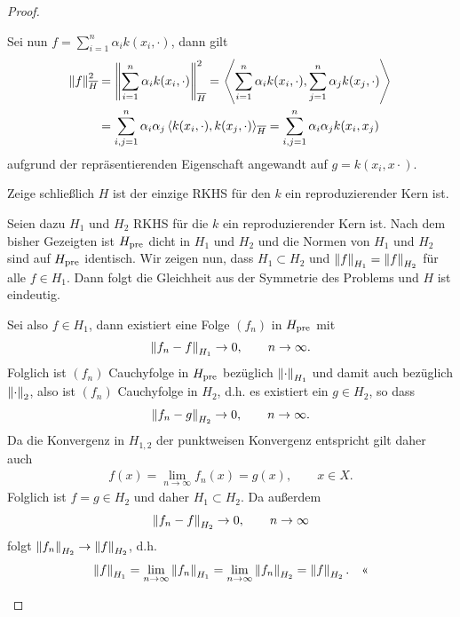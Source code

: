 \begin{proof}
\begin{proofenum}
\begin{proofenuma}
Sei nun $f=\sum_{i=1}^n \alpha_i k(x_i,\cdot)$, dann gilt
\begin{align*}
\left\|f\right\|_{{\overline{H}}}^2 &= \left\|\sum_{i=1}^n \alpha_i k(x_i,\cdot)\right\|_{{\overline{H}}}^2
= \left\langle\sum_{i=1}^n \alpha_i k(x_i,\cdot),\sum_{j=1}^n \alpha_j k(x_j,\cdot)\right\rangle\\
&= \sum_{i,j=1}^n \alpha_i\alpha_j \left\langle k(x_i,\cdot),k(x_j,\cdot)\right\rangle_{{\overline{H}}}
= \sum_{i,j=1}^n \alpha_i\alpha_j k(x_i,x_j)
\end{align*}
aufgrund der repräsentierenden Eigenschaft angewandt auf $g=k(x_i,x\cdot)$.
\end{proofenuma}
\item Zeige schließlich $H$ ist der einzige RKHS für den $k$ ein
reproduzierender Kern ist.

Seien dazu $H_1$ und $H_2$ RKHS für die $k$ ein reproduzierender Kern ist. Nach
dem bisher Gezeigten ist $H_{\mathrm{pre}}$ dicht in $H_1$ und $H_2$ und die Normen von
$H_1$ und $H_2$ sind auf $H_{\mathrm{pre}}$ identisch. Wir zeigen nun, dass $H_1\subset
H_2$ und $\left\|f\right\|_{H_1}= \left\|f\right\|_{H_2}$ für alle $f\in H_1$. Dann folgt die
Gleichheit aus der Symmetrie des Problems und $H$ ist eindeutig.

Sei also $f\in H_1$, dann existiert eine Folge $(f_n)$ in $H_{\mathrm{pre}}$ mit
\begin{align*}
\left\|f_n-f\right\|_{H_1}\to 0,\qquad n\to\infty.
\end{align*}
Folglich ist $(f_n)$ Cauchyfolge in $H_{\mathrm{pre}}$
bezüglich $\left\|\cdot\right\|_{H_1}$ und damit auch bezüglich $\left\|\cdot\right\|_2$, also
ist $(f_n)$ Cauchyfolge in $H_2$, d.h. es existiert ein $g\in H_2$, so dass
\begin{align*}
\left\|f_n-g\right\|_{H_2} \to 0,\qquad n\to\infty.
\end{align*}
Da die Konvergenz in $H_{1,2}$ der punktweisen Konvergenz entspricht gilt daher
auch
\begin{align*}
f(x) = \lim\limits_{n\to\infty} f_n(x) = g(x),\qquad x\in X.
\end{align*}
Folglich ist $f=g\in H_2$ und daher $H_1\subset H_2$. Da außerdem
\begin{align*}
\left\|f_n-f\right\|_{H_2} \to 0,\qquad n\to\infty
\end{align*}
folgt $\left\|f_n\right\|_{H_2}\to \left\|f\right\|_{H_2}$, d.h.
\begin{align*}
\left\|f\right\|_{H_1} =\lim\limits_{n\to\infty} \left\|f_n\right\|_{H_1}
=
\lim\limits_{n\to\infty} \left\|f_n\right\|_{H_2}
=
\left\|f\right\|_{H_2}.\quad\text{<<}
\end{align*}
\end{proofenum}
\end{proof}


